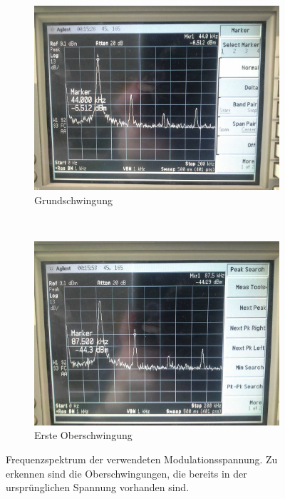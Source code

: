 \FloatBarrier
\begin{figure}[!h]
\begin{subfigure}[t]{0.5\textwidth}
	\centering
	\includegraphics[scale=0.17]{../Grafiken/ModulationsspannungOberwellen_0.jpg}
	\caption{Grundschwingung \label{fig:modulationsspannungoberwellen_0}}
\end{subfigure}%
~
\begin{subfigure}[t]{0.5\textwidth}
	\centering
	\includegraphics[scale=0.17]{../Grafiken/ModulationsspannungOberwellen_1.jpg}
	\caption{Erste Oberschwingung\label{fig:modulationsspannungoberwellen_1}}
\end{subfigure}
	\caption{Frequenzspektrum der verwendeten Modulationsspannung. Zu erkennen sind die Oberschwingungen,
		     die bereits in der ursprünglichen Spannung vorhanden sind. \label{fig:modulationsspannungoberwellen}}
\end{figure}
\FloatBarrier
